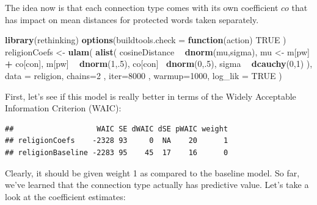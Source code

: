 \documentclass[12pt,]{book}
\newenvironment{Shaded}{\begin{snugshade}}{\end{snugshade}}
\newcommand{\KeywordTok}[1]{\textcolor[rgb]{0.13,0.29,0.53}{\textbf{#1}}}
\newcommand{\DataTypeTok}[1]{\textcolor[rgb]{0.13,0.29,0.53}{#1}}
\newcommand{\DecValTok}[1]{\textcolor[rgb]{0.00,0.00,0.81}{#1}}
\newcommand{\StringTok}[1]{\textcolor[rgb]{0.31,0.60,0.02}{#1}}
\newcommand{\OtherTok}[1]{\textcolor[rgb]{0.56,0.35,0.01}{#1}}
\newcommand{\ControlFlowTok}[1]{\textcolor[rgb]{0.13,0.29,0.53}{\textbf{#1}}}
\newcommand{\OperatorTok}[1]{\textcolor[rgb]{0.81,0.36,0.00}{\textbf{#1}}}
\newcommand{\NormalTok}[1]{#1}
\begin{document}
\noindent The idea now is that each connection type comes with its own
coefficient \(co\) that has impact on mean distances for protected words
taken separately.

\vspace{1mm} \footnotesize

\begin{Shaded}
\begin{Highlighting}[]
\KeywordTok{library}\NormalTok{(rethinking)}
\KeywordTok{options}\NormalTok{(}\DataTypeTok{buildtools.check =} \ControlFlowTok{function}\NormalTok{(action) }\OtherTok{TRUE}\NormalTok{ )}
\NormalTok{religionCoefs <-}\StringTok{ }\KeywordTok{ulam}\NormalTok{(}
  \KeywordTok{alist}\NormalTok{(}
\NormalTok{    cosineDistance }\OperatorTok{~}\StringTok{ }\KeywordTok{dnorm}\NormalTok{(mu,sigma),}
\NormalTok{    mu <-}\StringTok{ }\NormalTok{m[pw] }\OperatorTok{+}\StringTok{ }\NormalTok{co[con],}
\NormalTok{    m[pw] }\OperatorTok{~}\StringTok{ }\KeywordTok{dnorm}\NormalTok{(}\DecValTok{1}\NormalTok{,.}\DecValTok{5}\NormalTok{),}
\NormalTok{    co[con] }\OperatorTok{~}\KeywordTok{dnorm}\NormalTok{(}\DecValTok{0}\NormalTok{,.}\DecValTok{5}\NormalTok{),}
\NormalTok{    sigma }\OperatorTok{~}\StringTok{ }\KeywordTok{dcauchy}\NormalTok{(}\DecValTok{0}\NormalTok{,}\DecValTok{1}\NormalTok{)}
\NormalTok{  ),}
  \DataTypeTok{data =}\NormalTok{ religion,}
  \DataTypeTok{chains=}\DecValTok{2}\NormalTok{ , }\DataTypeTok{iter=}\DecValTok{8000}\NormalTok{ , }\DataTypeTok{warmup=}\DecValTok{1000}\NormalTok{, }
  \DataTypeTok{log_lik =} \OtherTok{TRUE}
\NormalTok{)}
\end{Highlighting}
\end{Shaded}

\normalsize

\noindent First, let's see if this model is really better in terms of
the Widely Acceptable Information Criterion (WAIC):

\vspace{1mm} \footnotesize

\begin{verbatim}
##                   WAIC SE dWAIC dSE pWAIC weight
## religionCoefs    -2328 93     0  NA    20      1
## religionBaseline -2283 95    45  17    16      0
\end{verbatim}

\normalsize

Clearly, it should be given weight 1 as compared to the baseline model.
So far, we've learned that the connection type actually has predictive
value. Let's take a look at the coefficient estimates:
\end{document}
